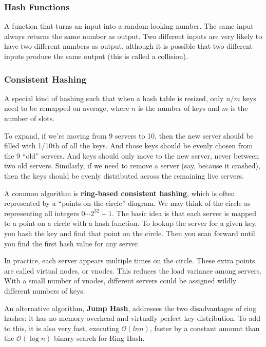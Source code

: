 \documentclass{article}
\begin{document}
    \subsubsection{Hash Functions}
    A function that turns an input into a random-looking number. The same input always returns the same number as output. Two different inputs are very likely to have two different numbers as output,  although it is possible that two different inputs produce the same output (this is called a collision).
    
    \subsubsection{Consistent Hashing}
    A special kind of hashing such that when a hash table is resized, only $n/m$ keys need to be remapped on average, where $n$ is the number of keys and $m$ is the number of slots.
    
    To expand, if we’re moving from 9 servers to 10, then the new server should be filled with 1/10th of all the keys. And those keys should be evenly chosen from the 9 ``old” servers. And keys should only move to the new server, never between two old servers. Similarly, if we need to remove a server (say, because it crashed), then the keys should be evenly distributed across the remaining live servers.
    
    A common algorithm is \textbf{ring-based consistent hashing}, which is often represented by a ``points-on-the-circle” diagram. We may think of the circle as representing all integers $0 \cdots2^{32}-1$. The basic idea is that each server is mapped to a point on a circle with a hash function. To lookup the server for a given key, you hash the key and find that point on the circle. Then you scan forward until you find the first hash value for any server.
    
    In practice, each server appears multiple times on the circle. These extra points are called virtual nodes, or vnodes. This reduces the load variance among servers. With a small number of vnodes, different servers could be assigned wildly different numbers of keys.
    
    An alternative algorithm, \textbf{Jump Hash}, addresses the two disadvantages of ring hashes: it has no memory overhead and virtually perfect key distribution. To add to this, it is also very fast, executing $\mathcal{O}(ln n)$, faster by a constant amount than the $\mathcal{O}(\log n)$ binary search for Ring Hash.
    
\end{document}
